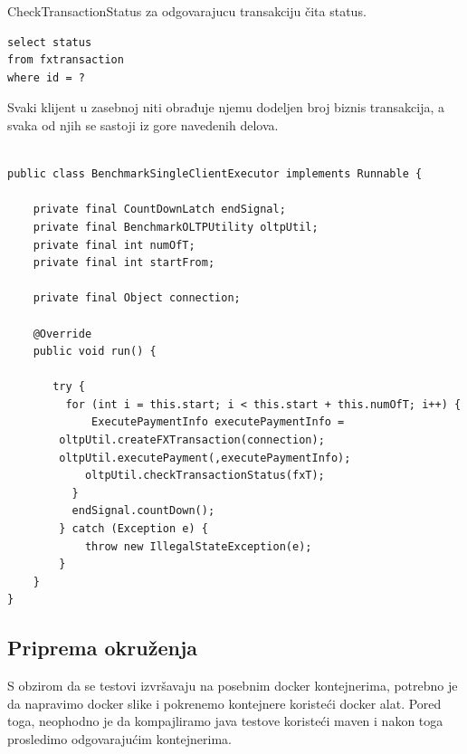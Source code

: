 \documentclass[12pt,oneside]{memoir}
\begin{document}
CheckTransactionStatus za odgovarajucu transakciju čita status.


\begin{lstlisting}[title={CheckTransactionStatus},captionpos=t]
select status
from fxtransaction
where id = ?
\end{lstlisting}


Svaki klijent u zasebnoj niti obrađuje njemu dodeljen broj biznis transakcija, a svaka od njih se sastoji iz gore navedenih delova.


\begin{lstlisting}[title={BenchmarkSingleClientExecutor.java},captionpos=t]

public class BenchmarkSingleClientExecutor implements Runnable {

    private final CountDownLatch endSignal;
    private final BenchmarkOLTPUtility oltpUtil;
    private final int numOfT;
    private final int startFrom;

    private final Object connection;

    @Override
    public void run() {

       try {
         for (int i = this.start; i < this.start + this.numOfT; i++) {
             ExecutePaymentInfo executePaymentInfo = 
	    oltpUtil.createFXTransaction(connection);
	    oltpUtil.executePayment(,executePaymentInfo);
            oltpUtil.checkTransactionStatus(fxT);
          }
          endSignal.countDown();
        } catch (Exception e) {
            throw new IllegalStateException(e);
        }
    }
}

\end{lstlisting}



\subsection{Priprema okruženja}

S obzirom da se testovi izvršavaju na posebnim docker kontejnerima, potrebno  je da napravimo docker slike i pokrenemo kontejnere koristeći docker alat. Pored toga, neophodno je da kompajliramo java testove koristeći maven i nakon toga  prosledimo  odgovarajućim  kontejnerima.
\end{document}
